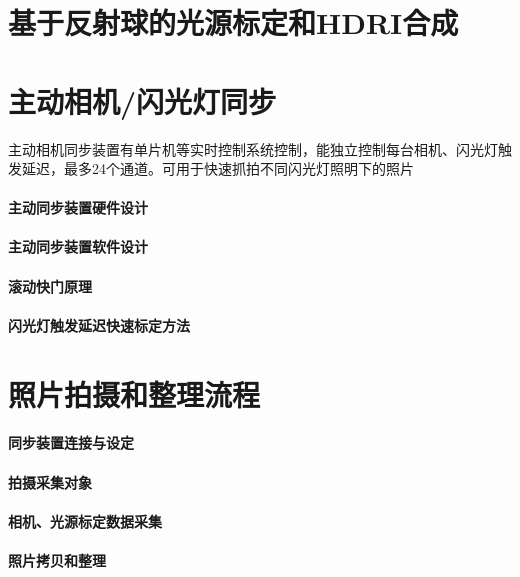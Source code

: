 \documentclass{scutmaster}
\begin{document}
\section{基于反射球的光源标定和HDRI合成}

\section{主动相机/闪光灯同步}

主动相机同步装置有单片机等实时控制系统控制，能独立控制每台相机、闪光灯触发延迟，最多24个通道。可用于快速抓拍不同闪光灯照明下的照片

\paragraph{主动同步装置硬件设计}

\paragraph{主动同步装置软件设计}

\paragraph{滚动快门原理}

\paragraph{闪光灯触发延迟快速标定方法}

\section{照片拍摄和整理流程}

\paragraph{同步装置连接与设定}

\paragraph{拍摄采集对象}

\paragraph{相机、光源标定数据采集}

\paragraph{照片拷贝和整理}
\end{document}
